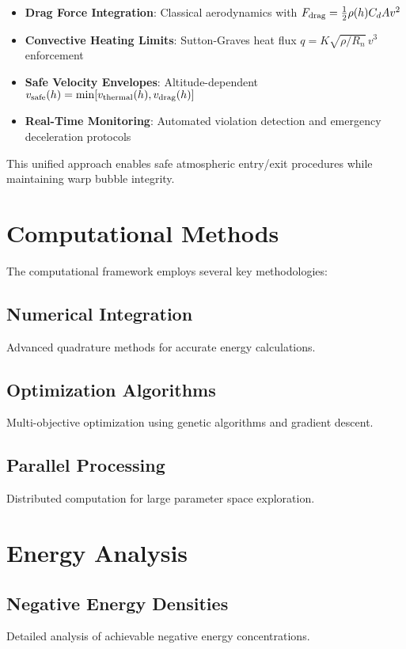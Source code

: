 \documentclass{article}
\begin{document}
\begin{itemize}
\item \textbf{Drag Force Integration}: Classical aerodynamics with $F_{\rm drag}=\tfrac{1}{2}\rho(h)C_d A v^2$
\item \textbf{Convective Heating Limits}: Sutton-Graves heat flux $q=K\sqrt{\rho/R_n}\,v^3$ enforcement
\item \textbf{Safe Velocity Envelopes}: Altitude-dependent $v_{\rm safe}(h)=\min[v_{\rm thermal}(h),v_{\rm drag}(h)]$
\item \textbf{Real-Time Monitoring}: Automated violation detection and emergency deceleration protocols
\end{itemize}

This unified approach enables safe atmospheric entry/exit procedures while maintaining warp bubble integrity.

\section{Computational Methods}

The computational framework employs several key methodologies:

\subsection{Numerical Integration}
Advanced quadrature methods for accurate energy calculations.

\subsection{Optimization Algorithms}
Multi-objective optimization using genetic algorithms and gradient descent.

\subsection{Parallel Processing}
Distributed computation for large parameter space exploration.

\section{Energy Analysis}

\subsection{Negative Energy Densities}
Detailed analysis of achievable negative energy concentrations.
\end{document}
